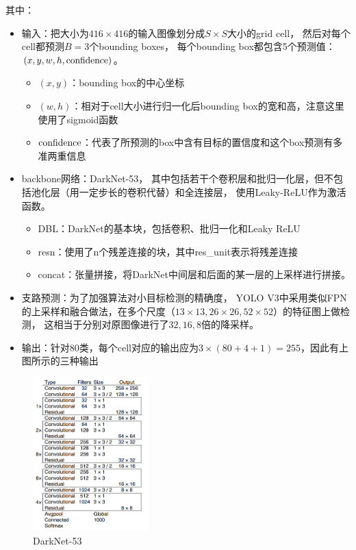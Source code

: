 \documentclass[UTF8]{ctexart}
\begin{document}
其中：
\begin{itemize}
    \item 输入：把大小为$416\times416$的输入图像划分成$S×S$大小的grid cell，
    然后对每个cell都预测$B=3$个bounding boxes，
    每个bounding box都包含5个预测值：$(x,y,w,h,{\rm confidence})$。
    \begin{itemize}
        \item $(x,y)$：bounding box的中心坐标
        \item $(w,h)$：相对于cell大小进行归一化后bounding box的宽和高，注意这里使用了sigmoid函数
        \item ${\rm confidence}$：代表了所预测的box中含有目标的置信度和这个box预测有多准两重信息
    \end{itemize}
    \item backbone网络：DarkNet-53，
    其中包括若干个卷积层和批归一化层，但不包括池化层（用一定步长的卷积代替）和全连接层，
    使用Leaky-ReLU作为激活函数。
    \begin{itemize}
        \item DBL：DarkNet的基本块，包括卷积、批归一化和Leaky ReLU
        \item resn：使用了n个残差连接的块，其中res\_unit表示将残差连接
        \item concat：张量拼接，将DarkNet中间层和后面的某一层的上采样进行拼接。
    \end{itemize}
    \item 支路预测：为了加强算法对小目标检测的精确度，
    YOLO V3中采用类似FPN的上采样和融合做法，在多个尺度（$13\times13,26\times26,52\times52$）的特征图上做检测，
    这相当于分别对原图像进行了$32,16,8$倍的降采样。
    \item 输出：针对80类，每个cell对应的输出应为$3\times(80+4+1)=255$，因此有上图所示的三种输出
\end{itemize}

\begin{figure}[htbp]
    \centering
    \includegraphics[width=0.40\textwidth]{../img/darknet53.png}
    \caption{DarkNet-53}
\end{figure}
\end{document}
